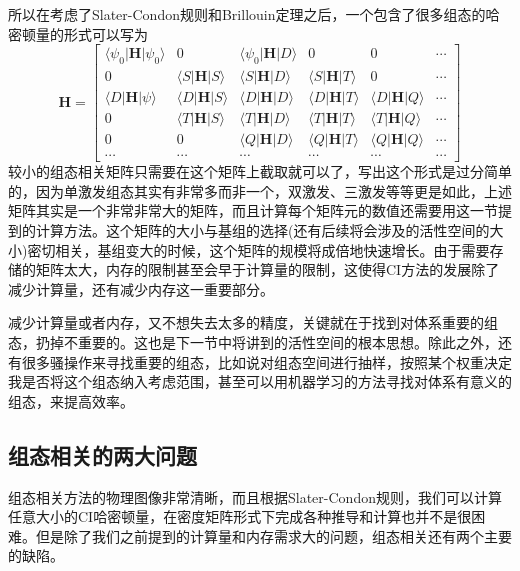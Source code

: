 \documentclass[12pt,a4paper,openany,twoside]{book}
\numberwithin{equation}{section}
\begin{document}
          所以在考虑了Slater-Condon规则和Brillouin定理之后，一个包含了很多组态的哈密顿量的形式可以写为
          \begin{equation}
            \mathbf{H} = \left[\begin{array}{cccccc}
            {\langle\psi_0|\mathbf{H}|\psi_0\rangle}&{0}&{\langle\psi_0|\mathbf{H}|D\rangle} &{0}&{0}&{\cdots}\\
            {0}&{ \langle S|\mathbf{H}| S\rangle} & {\langle S|\mathbf{H}| D\rangle}& {\langle S|\mathbf{H}| T\rangle}&{0}&{\cdots} \\
            {\langle D|\mathbf{H }|\psi\rangle}& {\langle D|\mathbf{H}| S\rangle} & {\langle D|\mathbf{H}| D\rangle} & {\langle D|\mathbf{H}| T\rangle} & {\langle D|\mathbf{H}| Q\rangle}&{\cdots}\\
            {0}&{\langle T|\mathbf{H}|S\rangle}&{\langle T|\mathbf{H}|D\rangle}&{\langle T|\mathbf{H}|T\rangle}&{\langle T|\mathbf{H}|Q\rangle}&{\cdots}\\
            {0}&{0}&{\langle Q|\mathbf{H}|D\rangle}&{\langle Q|\mathbf{H}|T\rangle}&{\langle Q|\mathbf{H}|Q\rangle}&{\cdots}\\
            {\cdots}&{\cdots}&{\cdots}&{\cdots}&{\cdots}&{\cdots}
            \end{array}\right]
            \label{CI matrix}
          \end{equation}
          较小的组态相关矩阵只需要在这个矩阵上截取就可以了，写出这个形式是过分简单的，因为单激发组态其实有非常多而非一个，双激发、三激发等等更是如此，上述矩阵其实是一个非常非常大的矩阵，而且计算每个矩阵元的数值还需要用这一节提到的计算方法。这个矩阵的大小与基组的选择(还有后续将会涉及的活性空间的大小)密切相关，基组变大的时候，这个矩阵的规模将成倍地快速增长。由于需要存储的矩阵太大，内存的限制甚至会早于计算量的限制，这使得CI方法的发展除了减少计算量，还有减少内存这一重要部分。

          减少计算量或者内存，又不想失去太多的精度，关键就在于找到对体系重要的组态，扔掉不重要的。这也是下一节中将讲到的活性空间的根本思想。除此之外，还有很多骚操作来寻找重要的组态，比如说对组态空间进行抽样，按照某个权重决定我是否将这个组态纳入考虑范围，甚至可以用机器学习的方法寻找对体系有意义的组态，来提高效率。        
        \subsection{组态相关的两大问题}
          组态相关方法的物理图像非常清晰，而且根据Slater-Condon规则，我们可以计算任意大小的CI哈密顿量，在密度矩阵形式下完成各种推导和计算也并不是很困难。但是除了我们之前提到的计算量和内存需求大的问题，组态相关还有两个主要的缺陷。
\end{document}
